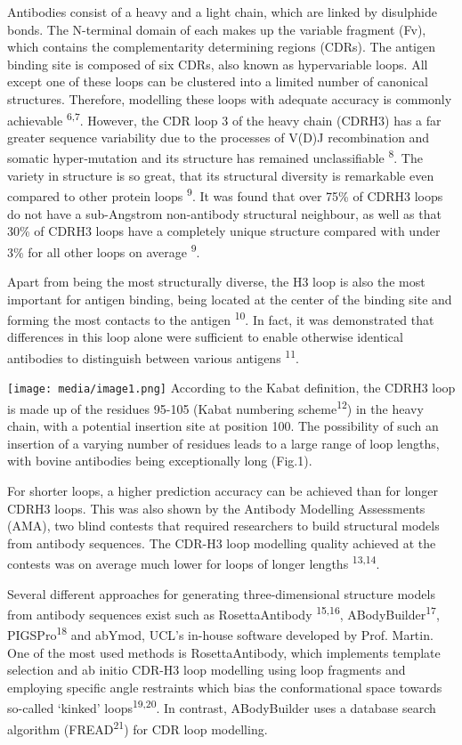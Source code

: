 \documentclass[
]{article}
\begin{document}
Antibodies consist of a heavy and a light chain, which are linked by
disulphide bonds. The N-terminal domain of each makes up the variable
fragment (Fv), which contains the complementarity determining regions
(CDRs). The antigen binding site is composed of six CDRs, also known as
hypervariable loops. All except one of these loops can be clustered into
a limited number of canonical structures. Therefore, modelling these
loops with adequate accuracy is commonly achievable
\textsuperscript{6,7}. However, the CDR loop 3 of the heavy chain
(CDRH3) has a far greater sequence variability due to the processes of
V(D)J recombination and somatic hyper‐mutation and its structure has
remained unclassifiable \textsuperscript{8}. The variety in structure is
so great, that its structural diversity is remarkable even compared to
other protein loops \textsuperscript{9}. It was found that over 75\% of
CDRH3 loops do not have a sub-Angstrom non-antibody structural
neighbour, as well as that 30\% of CDRH3 loops have a completely unique
structure compared with under 3\% for all other loops on average
\textsuperscript{9}.

Apart from being the most structurally diverse, the H3 loop is also the
most important for antigen binding, being located at the center of the
binding site and forming the most contacts to the antigen
\textsuperscript{10}. In fact, it was demonstrated that differences in
this loop alone were sufficient to enable otherwise identical antibodies
to distinguish between various antigens \textsuperscript{11}.

\texttt{[image: media/image1.png]}
According to the Kabat definition, the CDRH3 loop is made up of the
residues 95-105 (Kabat numbering scheme\textsuperscript{12}) in the
heavy chain, with a potential insertion site at position 100. The
possibility of such an insertion of a varying number of residues leads
to a large range of loop lengths, with bovine antibodies being
exceptionally long (Fig.1).

For shorter loops, a higher prediction accuracy can be achieved than for
longer CDRH3 loops. This was also shown by the Antibody Modelling
Assessments (AMA), two blind contests that required researchers to build
structural models from antibody sequences. The CDR-H3 loop modelling
quality achieved at the contests was on average much lower for loops of
longer lengths \textsuperscript{13,14}.

Several different approaches for generating three-dimensional structure
models from antibody sequences exist such as RosettaAntibody
\textsuperscript{15,16}, ABodyBuilder\textsuperscript{17},
PIGSPro\textsuperscript{18} and abYmod, UCL's in-house software
developed by Prof. Martin. One of the most used methods is
RosettaAntibody, which implements template selection and ab initio
CDR-H3 loop modelling using loop fragments and employing specific angle
restraints which bias the conformational space towards so-called
`kinked' loops\textsuperscript{19,20}. In contrast, ABodyBuilder uses a
database search algorithm (FREAD\textsuperscript{21}) for CDR loop
modelling.
\end{document}
